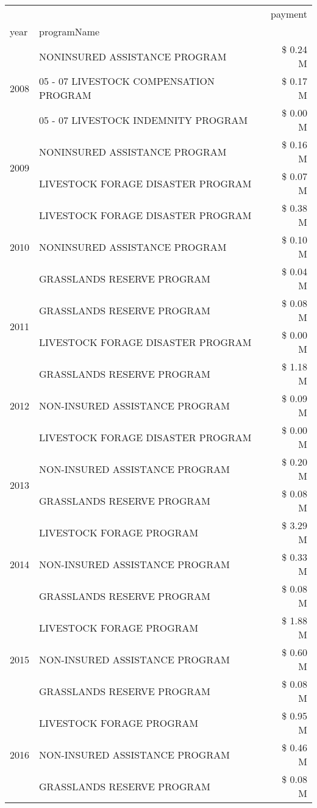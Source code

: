 \begin{tabular}{llr}
\toprule
 &  & payment \\
year & programName &  \\
\midrule
\multirow[t]{3}{*}{2008} & NONINSURED ASSISTANCE PROGRAM & \$ 0.24 M \\
 & 05 - 07 LIVESTOCK COMPENSATION PROGRAM & \$ 0.17 M \\
 & 05 - 07 LIVESTOCK INDEMNITY PROGRAM & \$ 0.00 M \\
\cline{1-3}
\multirow[t]{2}{*}{2009} & NONINSURED ASSISTANCE PROGRAM & \$ 0.16 M \\
 & LIVESTOCK FORAGE DISASTER  PROGRAM & \$ 0.07 M \\
\cline{1-3}
\multirow[t]{3}{*}{2010} & LIVESTOCK FORAGE DISASTER  PROGRAM & \$ 0.38 M \\
 & NONINSURED ASSISTANCE PROGRAM & \$ 0.10 M \\
 & GRASSLANDS RESERVE PROGRAM & \$ 0.04 M \\
\cline{1-3}
\multirow[t]{2}{*}{2011} & GRASSLANDS RESERVE PROGRAM & \$ 0.08 M \\
 & LIVESTOCK FORAGE DISASTER PROGRAM & \$ 0.00 M \\
\cline{1-3}
\multirow[t]{3}{*}{2012} & GRASSLANDS RESERVE PROGRAM & \$ 1.18 M \\
 & NON-INSURED ASSISTANCE PROGRAM & \$ 0.09 M \\
 & LIVESTOCK FORAGE DISASTER PROGRAM & \$ 0.00 M \\
\cline{1-3}
\multirow[t]{2}{*}{2013} & NON-INSURED ASSISTANCE PROGRAM & \$ 0.20 M \\
 & GRASSLANDS RESERVE PROGRAM & \$ 0.08 M \\
\cline{1-3}
\multirow[t]{3}{*}{2014} & LIVESTOCK FORAGE PROGRAM & \$ 3.29 M \\
 & NON-INSURED ASSISTANCE PROGRAM & \$ 0.33 M \\
 & GRASSLANDS RESERVE PROGRAM & \$ 0.08 M \\
\cline{1-3}
\multirow[t]{3}{*}{2015} & LIVESTOCK FORAGE PROGRAM & \$ 1.88 M \\
 & NON-INSURED ASSISTANCE PROGRAM & \$ 0.60 M \\
 & GRASSLANDS RESERVE PROGRAM & \$ 0.08 M \\
\cline{1-3}
\multirow[t]{3}{*}{2016} & LIVESTOCK FORAGE PROGRAM                      & \$ 0.95 M \\
 & NON-INSURED ASSISTANCE PROGRAM                & \$ 0.46 M \\
 & GRASSLANDS RESERVE PROGRAM                    & \$ 0.08 M \\

\end{tabular}
